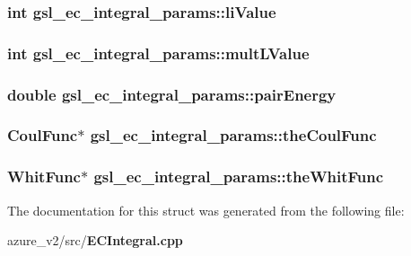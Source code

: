 \subsubsection{\setlength{\rightskip}{0pt plus 5cm}int \bf{gsl\_\-ec\_\-integral\_\-params::li\-Value}}\label{structgsl__ec__integral__params_27209fe29fec5a8f86dad0573f1831e7}


\subsubsection{\setlength{\rightskip}{0pt plus 5cm}int \bf{gsl\_\-ec\_\-integral\_\-params::mult\-LValue}}\label{structgsl__ec__integral__params_65ba9cd81988aece930183e89cb697e3}


\subsubsection{\setlength{\rightskip}{0pt plus 5cm}double \bf{gsl\_\-ec\_\-integral\_\-params::pair\-Energy}}\label{structgsl__ec__integral__params_c5f16e8e339da12502c166a261cd3fe3}


\subsubsection{\setlength{\rightskip}{0pt plus 5cm}\bf{Coul\-Func}$\ast$ \bf{gsl\_\-ec\_\-integral\_\-params::the\-Coul\-Func}}\label{structgsl__ec__integral__params_413a34fdb4514a520c67b1cd8abace6b}


\subsubsection{\setlength{\rightskip}{0pt plus 5cm}\bf{Whit\-Func}$\ast$ \bf{gsl\_\-ec\_\-integral\_\-params::the\-Whit\-Func}}\label{structgsl__ec__integral__params_21472862db65dfdb0243bca2857c7699}




The documentation for this struct was generated from the following file:\begin{CompactItemize}
\item 
azure\_\-v2/src/\bf{ECIntegral.cpp}\end{CompactItemize}
